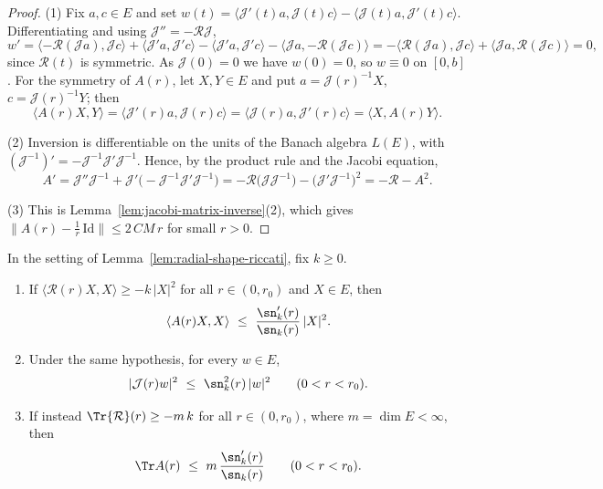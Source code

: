 \begin{proof}
\leanok
(1) Fix $a,c\in E$ and set
$w(t)=\langle{\mathcal J}'(t)a,{\mathcal J}(t)c\rangle
-\langle{\mathcal J}(t)a,{\mathcal J}'(t)c\rangle$. Differentiating and
using ${\mathcal J}''=-{\mathcal R}{\mathcal J}$,
$$w'=\langle-{\mathcal R}({\mathcal J}a),{\mathcal J}c\rangle
+\langle{\mathcal J}'a,{\mathcal J}'c\rangle
-\langle{\mathcal J}'a,{\mathcal J}'c\rangle
-\langle{\mathcal J}a,-{\mathcal R}({\mathcal J}c)\rangle
=-\langle{\mathcal R}({\mathcal J}a),{\mathcal J}c\rangle
+\langle{\mathcal J}a,{\mathcal R}({\mathcal J}c)\rangle=0,$$
since ${\mathcal R}(t)$ is symmetric. As ${\mathcal J}(0)=0$ we have
$w(0)=0$, so $w\equiv0$ on $[0,b]$. For the symmetry of $A(r)$, let
$X,Y\in E$ and put $a={\mathcal J}(r)^{-1}X$, $c={\mathcal
J}(r)^{-1}Y$; then
$$\langle A(r)X,Y\rangle=\langle{\mathcal J}'(r)a,{\mathcal J}(r)c\rangle
=\langle{\mathcal J}(r)a,{\mathcal J}'(r)c\rangle=\langle X,A(r)Y\rangle .$$

(2) Inversion is differentiable on the units of the Banach algebra
$L(E)$, with $({\mathcal J}^{-1})'=-{\mathcal J}^{-1}{\mathcal
J}'{\mathcal J}^{-1}$. Hence, by the product rule and the Jacobi
equation,
$$A'={\mathcal J}''{\mathcal J}^{-1}
+{\mathcal J}'\bigl(-{\mathcal J}^{-1}{\mathcal J}'{\mathcal
J}^{-1}\bigr)
=-{\mathcal R}\bigl({\mathcal J}{\mathcal J}^{-1}\bigr)
-\bigl({\mathcal J}'{\mathcal J}^{-1}\bigr)^2
=-{\mathcal R}-A^2 .$$

(3) This is Lemma~\ref{lem:jacobi-matrix-inverse}(2), which gives
$\|A(r)-\tfrac1r\,\mathrm{Id}\|\le2\,CM\,r$ for small $r>0$.
\end{proof}

\begin{lemma}
\label{lem:radial-comparison}
\leanok
In the setting of Lemma~\ref{lem:radial-shape-riccati}, fix $k\ge0$.
\begin{enumerate}
\item If $\langle{\mathcal R}(r)X,X\rangle\ge-k\,|X|^2$ for all
$r\in(0,r_0)$ and $X\in E$, then
$$\langle A(r)X,X\rangle\ \le\ \frac{\sn_k'(r)}{\sn_k(r)}\,|X|^2 .$$
\item Under the same hypothesis, for every $w\in E$,
$$|{\mathcal J}(r)w|^2\ \le\ \sn_k^2(r)\,|w|^2\qquad(0<r<r_0).$$
\item If instead $\Tr{\mathcal R}(r)\ge-m\,k$ for all $r\in(0,r_0)$,
where $m=\dim E<\infty$, then
$$\Tr A(r)\ \le\ m\,\frac{\sn_k'(r)}{\sn_k(r)}\qquad(0<r<r_0).$$
\end{enumerate}
\end{lemma}


